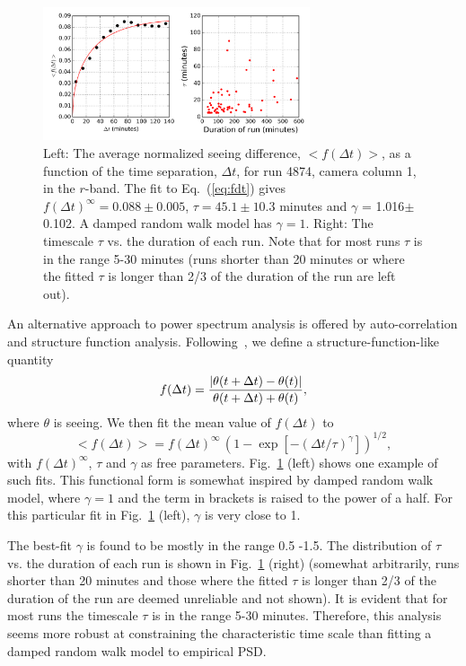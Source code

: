 \begin{figure}[th]
\centering
\includegraphics[width=0.7\textwidth]{FIGURES/fdt.png}
\caption{Left: The average normalized seeing difference, $<f(\Delta t)>$, as
  a function of the time separation, $\Delta t$, for run 4874, camera
   column 1, in the $r$-band. The fit to Eq.~(\ref{eq:fdt}) gives $f(\Delta t) ^\infty =  
   0.088\pm0.005$, $\tau = 45.1\pm10.3$ minutes and $\gamma$ =
   1.016$\pm$0.102. 
A damped random walk model has $\gamma=1$.
Right: The timescale $\tau$ vs. the duration of each run.
 Note that for most runs $\tau$ is in the range 5-30 minutes
    (runs shorter than 20 minutes or where the fitted $\tau$ is longer than 2/3 of the duration
    of the run are left out).  
\label{fig:fdt}}
\end{figure}


An alternative approach to power spectrum analysis is offered by auto-correlation 
and structure function analysis. Following~\cite{Racine1996}, we define a 
structure-function-like quantity
\begin{equation}
       f(\Delta t) = {| \theta(t+\Delta t) - \theta(t)| \over  \theta(t+\Delta t) + \theta(t) },
\end{equation} 
where $\theta$ is seeing. We then fit the mean value of $f(\Delta t)$ to 
\begin{equation}
    < f(\Delta t) > =  f(\Delta t) ^\infty \, \left( 1 - \exp[-(\Delta
      t/\tau)^\gamma] \right)^{1/2},
\label{eq:fdt}
\end{equation} 
with $f(\Delta t) ^\infty$, $\tau$ and $\gamma$ as free parameters.
Fig.~\ref{fig:fdt} (left) shows one example of such fits. This functional form is 
somewhat inspired by damped random walk model, where $\gamma=1$ and the 
term in brackets is raised to the power of a half. 
For this particular fit in Fig.~\ref{fig:fdt} (left), $\gamma$ is very close to 1.

The best-fit $\gamma$ is found to be mostly in the range 0.5 -1.5. 
The distribution of $\tau$ vs. 
the duration of each run is shown in Fig.~\ref{fig:fdt} (right) (somewhat 
arbitrarily,
runs shorter than 20 minutes and those where the fitted $\tau$ is longer than 2/3 of the duration
    of the run are deemed unreliable and not shown).  
It is evident that 
for most runs the timescale $\tau$ is in the range 5-30 minutes.
Therefore, this analysis seems more robust at constraining the characteristic time
scale than fitting a damped random walk model to empirical PSD. 
